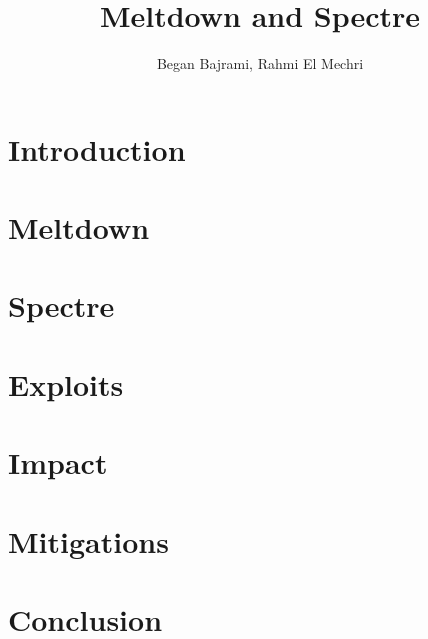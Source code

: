 \documentclass[10pt, a4paper, twocolumn]{article}
\title{Meltdown and Spectre}
\author{Began Bajrami, Rahmi El Mechri}
\begin{document}
\maketitle
\begin{abstract}

\end{abstract}
\section{Introduction}




\section{Meltdown}

\section{Spectre}

\section{Exploits}


\section{Impact}

\section{Mitigations}

\section{Conclusion}

\end{document}
